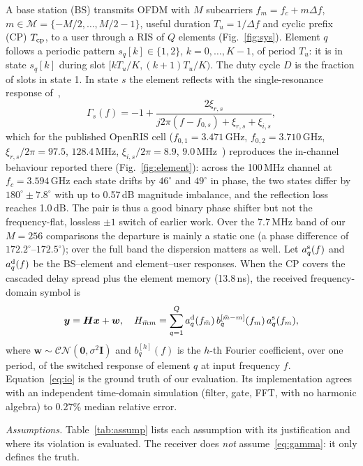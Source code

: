 \documentclass[conference,10pt]{IEEEtran}
\theoremstyle{remark}
\begin{document}
A base station (BS) transmits OFDM with $M$ subcarriers $f_m=f_c+m\Delta f$, $m\in\mathcal M=\{-M/2,\dots,M/2-1\}$,
useful duration $T_u=1/\Delta f$ and cyclic prefix (CP) $T_{\rm cp}$, to a user through a RIS of $Q$ elements
(Fig.~\ref{fig:sys}). Element $q$ follows a periodic pattern $s_q[k]\in\{1,2\}$, $k=0,\dots,K-1$, of period $T_u$: it is
in state $s_q[k]$ during slot $[kT_u/K,(k+1)T_u/K)$. The duty cycle $D$ is the fraction of slots in state 1. In state $s$
the element reflects with the single-resonance response of~\cite{iudice2026},
\begin{equation}
\Gamma_s(f)=-1+\frac{2\xi_{r,s}}{j2\pi(f-f_{0,s})+\xi_{r,s}+\xi_{i,s}},\label{eq:gamma}
\end{equation}
which for the published OpenRIS cell ($f_{0,1}=3.471$\,GHz, $f_{0,2}=3.710$\,GHz,
$\xi_{r,s}/2\pi=97.5$, $128.4$\,MHz, $\xi_{i,s}/2\pi=8.9$, $9.0$\,MHz~\cite[Tab.~I]{iudice2026}) reproduces the
in-channel behaviour reported there (Fig.~\ref{fig:element}): across the 100\,MHz channel at $f_c=3.594$\,GHz each state
drifts by $46^\circ$ and $49^\circ$ in phase, the two states differ by $180^\circ\pm7.8^\circ$ with up to 0.57\,dB magnitude
imbalance, and the reflection loss reaches 1.0\,dB. The pair is thus a good binary phase shifter but not the
frequency-flat, lossless $\pm1$ switch of earlier work. Over the 7.7\,MHz band of our $M=256$ comparisons the departure is
mainly a static one (a phase difference of $172.2^\circ$--$172.5^\circ$); over the full band the dispersion matters as well. Let $a^{\rm s}_q(f)$ and $a^{\rm d}_q(f)$ be the BS--element and
element--user responses. When the CP covers the cascaded delay spread plus the element memory (13.8\,ns), the received
frequency-domain symbol is~\cite{iudice2026}
\begin{equation}
\bm y=\bm H\bm x+\bm w,\quad H_{\bar mm}=\sum_{q=1}^{Q}a^{\rm d}_q(f_{\bar m})\,b_q^{[\bar m-m]}(f_m)\,a^{\rm s}_q(f_m),\label{eq:io}
\end{equation}
where $\bm w\sim\mathcal{CN}(\bm 0,\sigma^2\bm I)$ and $b_q^{[h]}(f)$ is the $h$-th Fourier coefficient, over one period,
of the switched response of element $q$ at input frequency $f$. Equation~\eqref{eq:io} is the ground truth of our
evaluation. Its implementation agrees with an independent time-domain simulation (filter, gate, FFT, with no harmonic
algebra) to 0.27\% median relative error.

\emph{Assumptions.} Table~\ref{tab:assump} lists each assumption with its justification and where its violation is
evaluated. The receiver does \emph{not} assume~\eqref{eq:gamma}: it only defines the truth.
\end{document}
